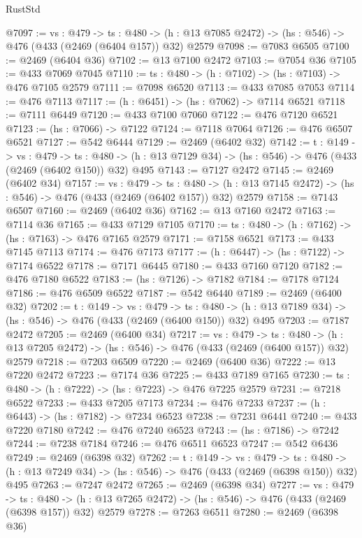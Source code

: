 \begin{lexlean}{RustStd}
\begin{coremodule}
@7097 := {vs : @479} ->
  {ts : @480} -> (h : @13 @7085 @2472) -> (hs : @546) -> @476 (@433 (@2469 (@6404 @157)) @32) @2579
@7098 := @7083 @6505
@7100 := @2469 (@6404 @36)
@7102 := @13 @7100 @2472
@7103 := @7054 @36
@7105 := @433 @7069 @7045
@7110 := {ts : @480} -> (h : @7102) -> (hs : @7103) -> @476 @7105 @2579
@7111 := @7098 @6520
@7113 := @433 @7085 @7053
@7114 := @476 @7113
@7117 := (h : @6451) -> (hs : @7062) -> @7114 @6521
@7118 := @7111 @6449
@7120 := @433 @7100 @7060
@7122 := @476 @7120 @6521
@7123 := (hs : @7066) -> @7122
@7124 := @7118 @7064
@7126 := @476 @6507 @6521
@7127 := @542 @6444
@7129 := @2469 (@6402 @32)
@7142 := {t : @149} ->
  {vs : @479} ->
  {ts : @480} -> (h : @13 @7129 @34) -> (hs : @546) -> @476 (@433 (@2469 (@6402 @150)) @32) @495
@7143 := @7127 @2472
@7145 := @2469 (@6402 @34)
@7157 := {vs : @479} ->
  {ts : @480} -> (h : @13 @7145 @2472) -> (hs : @546) -> @476 (@433 (@2469 (@6402 @157)) @32) @2579
@7158 := @7143 @6507
@7160 := @2469 (@6402 @36)
@7162 := @13 @7160 @2472
@7163 := @7114 @36
@7165 := @433 @7129 @7105
@7170 := {ts : @480} -> (h : @7162) -> (hs : @7163) -> @476 @7165 @2579
@7171 := @7158 @6521
@7173 := @433 @7145 @7113
@7174 := @476 @7173
@7177 := (h : @6447) -> (hs : @7122) -> @7174 @6522
@7178 := @7171 @6445
@7180 := @433 @7160 @7120
@7182 := @476 @7180 @6522
@7183 := (hs : @7126) -> @7182
@7184 := @7178 @7124
@7186 := @476 @6509 @6522
@7187 := @542 @6440
@7189 := @2469 (@6400 @32)
@7202 := {t : @149} ->
  {vs : @479} ->
  {ts : @480} -> (h : @13 @7189 @34) -> (hs : @546) -> @476 (@433 (@2469 (@6400 @150)) @32) @495
@7203 := @7187 @2472
@7205 := @2469 (@6400 @34)
@7217 := {vs : @479} ->
  {ts : @480} -> (h : @13 @7205 @2472) -> (hs : @546) -> @476 (@433 (@2469 (@6400 @157)) @32) @2579
@7218 := @7203 @6509
@7220 := @2469 (@6400 @36)
@7222 := @13 @7220 @2472
@7223 := @7174 @36
@7225 := @433 @7189 @7165
@7230 := {ts : @480} -> (h : @7222) -> (hs : @7223) -> @476 @7225 @2579
@7231 := @7218 @6522
@7233 := @433 @7205 @7173
@7234 := @476 @7233
@7237 := (h : @6443) -> (hs : @7182) -> @7234 @6523
@7238 := @7231 @6441
@7240 := @433 @7220 @7180
@7242 := @476 @7240 @6523
@7243 := (hs : @7186) -> @7242
@7244 := @7238 @7184
@7246 := @476 @6511 @6523
@7247 := @542 @6436
@7249 := @2469 (@6398 @32)
@7262 := {t : @149} ->
  {vs : @479} ->
  {ts : @480} -> (h : @13 @7249 @34) -> (hs : @546) -> @476 (@433 (@2469 (@6398 @150)) @32) @495
@7263 := @7247 @2472
@7265 := @2469 (@6398 @34)
@7277 := {vs : @479} ->
  {ts : @480} -> (h : @13 @7265 @2472) -> (hs : @546) -> @476 (@433 (@2469 (@6398 @157)) @32) @2579
@7278 := @7263 @6511
@7280 := @2469 (@6398 @36)

\end{coremodule}
\end{lexlean}
